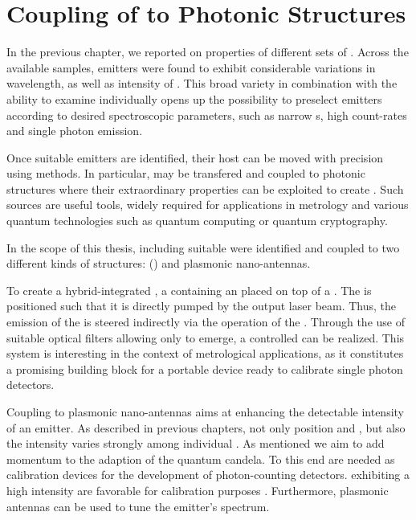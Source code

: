 
\chapter{Coupling of \Nds to Photonic Structures}	\label{ch::coupling}

	In the previous chapter, we reported on \pl properties of different sets of \sivs.
	Across the available samples, emitters were found to exhibit considerable variations in wavelength, \lw as well as intensity of \zpls.
	This broad variety in combination with the ability to examine \sivs individually opens up the possibility to preselect emitters according to desired spectroscopic parameters, such as narrow \lw{}s, high count-rates and single photon emission.

	Once suitable emitters are identified, their host \nds can be moved with precision using \pp methods.
	In particular, \sivs may be transfered and coupled to photonic structures where their extraordinary properties can be exploited to create \sps.
	Such sources are useful tools, widely required for applications in metrology and various quantum technologies such as quantum computing or quantum cryptography.

	In the scope of this thesis, \nds including suitable \sivs were identified and coupled to two different kinds of structures: \Vcsels (\VCSELs) and plasmonic nano-antennas.

	To create a hybrid-integrated \sps, a \nd containing an \siv placed on top of a \VCSEL. The \siv is positioned such that it is directly pumped by the \VCSEL output laser beam. Thus, the emission of the \siv is steered indirectly via the operation of the \VCSEL. Through the use of suitable optical filters allowing only \siv \fl to emerge, a controlled \sps can be realized. This system is interesting in the context of metrological applications, as it constitutes a promising building block for a portable device ready to calibrate single photon detectors.

	Coupling \sivs to plasmonic nano-antennas aims at enhancing the detectable \pl intensity of an emitter.
	As described in previous chapters, not only \ZPL position and \lw, but also the \pl intensity varies strongly among individual \sivs.
	As mentioned we aim to add momentum to the adaption of the quantum candela. To this end \spss are needed as calibration devices for the development of photon-counting detectors. \Spss exhibiting a high intensity are favorable for calibration purposes \cite{Vaigu2017}. Furthermore, plasmonic antennas can be used to tune the emitter's \pl spectrum.



